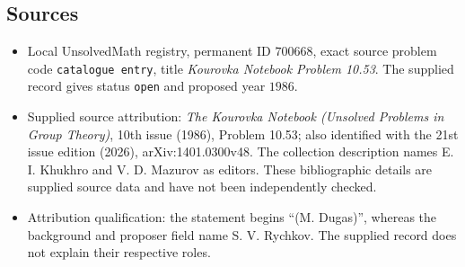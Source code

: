 \documentclass[11pt]{article}
\begin{document}
\subsection{Sources}
\begin{itemize}
\item Local UnsolvedMath registry, permanent ID \(700668\), exact source problem code \texttt{catalogue entry}, title \emph{Kourovka Notebook Problem 10.53}. The supplied record gives status \texttt{open} and proposed year \(1986\).
\item Supplied source attribution: \emph{The Kourovka Notebook (Unsolved Problems in Group Theory)}, 10th issue (1986), Problem 10.53; also identified with the 21st issue edition (2026), arXiv:1401.0300v48. The collection description names E. I. Khukhro and V. D. Mazurov as editors. These bibliographic details are supplied source data and have not been independently checked.
\item Attribution qualification: the statement begins ``(M. Dugas)'', whereas the background and proposer field name S. V. Rychkov. The supplied record does not explain their respective roles.
\end{itemize}
\end{document}
